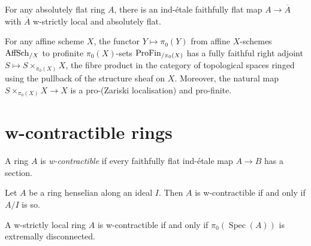 \begin{lemma}
\begin{lemma}
    \label{lem:absolute-flat-exists-ind-etale-w-strictly-local}

    For any absolutely flat ring $A$, there is an ind-étale faithfully flat map $A \to \overline{A}$ with $\overline{A}$ w-strictly local and absolutely flat. %
\end{lemma}

\begin{definition}%
    \label{lem:decouple-topology-from-algebra}

    For any affine scheme $X$, the functor $Y \mapsto \pi_0(Y)$ from affine $X$-schemes \(\operatorname{AffSch}_{/X}\) to profinite $\pi_0(X)$-sets \(\operatorname{ProFin}_{/\pi_0(X)}\) has a fully faithful right adjoint $S \mapsto S \times_{\pi_0(X)} X$, the fibre product in the category of topological spaces ringed using the pullback of the structure sheaf on $X$. Moreover, the natural map $S \times_{\pi_0(X)} X \to X$ is a pro-(Zariski localisation) and pro-finite.
\end{definition}

\section{w-contractible rings}

\begin{definition}
A ring \(A\) is \emph{w-contractible} if every faithfully flat ind-\'etale map \(A \to B\) has a section.
    \label{def:w-contractible-ring}
\end{definition}

\begin{lemma}
    \label{lem:w-contractible-henselian}

    Let $A$ be a ring henselian along an ideal $I$. Then $A$ is w-contractible if and only if $A/I$ is so.
\end{lemma}

\begin{lemma}
    \label{lem:w-strictly-local-pi0-extremally-disconnected}
    A w-strictly local ring $A$ is w-contractible if and only if $\pi_0(\operatorname{Spec}(A))$ is extremally disconnected.
\end{lemma}


\end{lemma}
